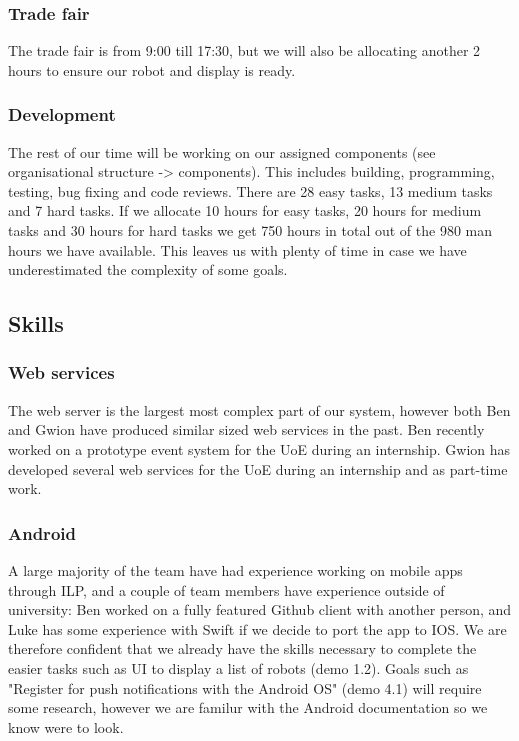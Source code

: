 \documentclass[onecolumn]{IEEEtran}
\begin{document}
\subsubsection{Trade fair}

The trade fair is from 9:00 till 17:30, but we will also be allocating another 2 hours to ensure our robot and display is ready.

\subsubsection{Development}

The rest of our time will be working on our assigned components (see organisational structure -> components). This includes building, programming, testing, bug fixing and code reviews. There are 28 easy tasks, 13 medium tasks and 7 hard tasks. If we allocate 10 hours for easy tasks, 20 hours for medium tasks and 30 hours for hard tasks we get 750 hours in total out of the 980 man hours we have available. This leaves us with plenty of time in case we have underestimated the complexity of some goals.

\subsection{Skills}

\subsubsection{Web services}

The web server is the largest most complex part of our system, however both Ben and Gwion have produced similar sized web services in the past. Ben recently worked on a prototype event system for the UoE during an internship. Gwion has developed several web services for the UoE during an internship and as part-time work.

\subsubsection{Android}

A large majority of the team have had experience working on mobile apps through ILP, and a couple of team members have experience outside of university: Ben worked on a fully featured Github client with another person, and Luke has some experience with Swift if we decide to port the app to IOS. We are therefore confident that we already have the skills necessary to complete the easier tasks such as UI to display a list of robots (demo 1.2). Goals such as "Register for push notifications with the Android OS" (demo 4.1) will require some research, however we are familur with the Android documentation so we know were to look.
\end{document}
